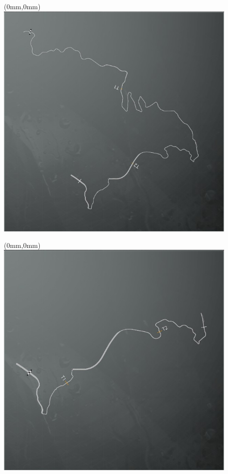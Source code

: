 \null\newpage
\begin{textblock*}{30mm}(0mm,0mm)%
\includegraphics[width=120mm]{TR/2015-05-20_00006.png}
\end{textblock*}
\null\newpage
\begin{textblock*}{30mm}(0mm,0mm)%
\includegraphics[width=120mm]{TR/2015-05-20_00003.png}
\end{textblock*}
